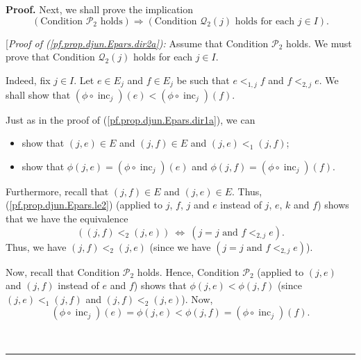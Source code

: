 \documentclass[numbers=enddot,12pt,final,onecolumn,notitlepage,abstracton]{scrartcl}
\theoremstyle{definition}
\newenvironment{proof}[1][Proof]{\noindent\textbf{#1.} }{\ \rule{0.5em}{0.5em}}
\newenvironment{verlong}{}{}
\begin{document}
\begin{verlong}
\begin{footnotesize}
\begin{proof}
Next, we shall prove the implication%
\begin{equation}
\left(  \text{Condition }\mathcal{P}_{2}\text{ holds}\right)  \Longrightarrow
\left(  \text{Condition }\mathcal{Q}_{2}\left(  j\right)  \text{ holds for
each }j\in I\right)  . \label{pf.prop.djun.Epars.dir2a}%
\end{equation}


[\textit{Proof of (\ref{pf.prop.djun.Epars.dir2a}):} Assume that Condition
$\mathcal{P}_{2}$ holds. We must prove that Condition $\mathcal{Q}_{2}\left(
j\right)  $ holds for each $j\in I$.

Indeed, fix $j\in I$. Let $e\in E_{j}$ and $f\in E_{j}$ be such that
$e<_{1,j}f$ and $f<_{2,j}e$. We shall show that $\left(  \phi\circ
\operatorname*{inc}\nolimits_{j}\right)  \left(  e\right)  <\left(  \phi
\circ\operatorname*{inc}\nolimits_{j}\right)  \left(  f\right)  $.

Just as in the proof of (\ref{pf.prop.djun.Epars.dir1a}), we can

\begin{itemize}
\item show that $\left(  j,e\right)  \in E$ and $\left(  j,f\right)  \in E$
and $\left(  j,e\right)  <_{1}\left(  j,f\right)  $;

\item show that $\phi\left(  j,e\right)  =\left(  \phi\circ\operatorname*{inc}%
\nolimits_{j}\right)  \left(  e\right)  $ and $\phi\left(  j,f\right)
=\left(  \phi\circ\operatorname*{inc}\nolimits_{j}\right)  \left(  f\right)  $.
\end{itemize}

Furthermore, recall that $\left(  j,f\right)  \in E$ and $\left(  j,e\right)
\in E$. Thus, (\ref{pf.prop.djun.Epars.le2}) (applied to $j$, $f$, $j$ and $e$
instead of $j$, $e$, $k$ and $f$) shows that we have the equivalence%
\[
\left(  \left(  j,f\right)  <_{2}\left(  j,e\right)  \right)
\ \Longleftrightarrow\ \left(  j=j\text{ and }f<_{2,j}e\right)  .
\]
Thus, we have $\left(  j,f\right)  <_{2}\left(  j,e\right)  $ (since we have
$\left(  j=j\text{ and }f<_{2,j}e\right)  $).

Now, recall that Condition $\mathcal{P}_{2}$ holds. Hence, Condition
$\mathcal{P}_{2}$ (applied to $\left(  j,e\right)  $ and $\left(  j,f\right)
$ instead of $e$ and $f$) shows that $\phi\left(  j,e\right)  <\phi\left(
j,f\right)  $ (since $\left(  j,e\right)  <_{1}\left(  j,f\right)  $ and
$\left(  j,f\right)  <_{2}\left(  j,e\right)  $). Now,%
\[
\left(  \phi\circ\operatorname*{inc}\nolimits_{j}\right)  \left(  e\right)
=\phi\left(  j,e\right)  <\phi\left(  j,f\right)  =\left(  \phi\circ
\operatorname*{inc}\nolimits_{j}\right)  \left(  f\right)  .
\]



\end{proof}
\end{footnotesize}
\end{verlong}
\end{document}
